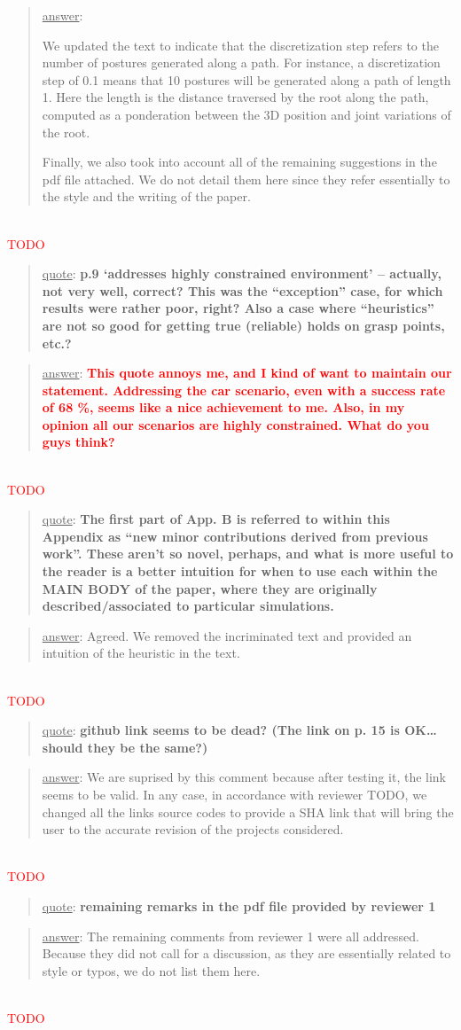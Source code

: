 \documentclass[a4paper]{article}
\newcommand{\ndone}[0]{\textcolor{red}{TODO}}
\newcommand\quot[1]{\begin{quote} \underline{quote}: \textbf{#1}\end{quote}}
\newcommand\as[1]{\begin{quote} \underline{answer}: {#1}\end{quote} \leavevmode \\ }
\begin{document}
\as{We updated the text to indicate that the discretization step refers to the number of postures generated along a path. For instance, a discretization step of 0.1 means
that 10 postures will be generated along a path of length 1. Here the length is the distance traversed by the root along the path, computed as a ponderation between the 3D position and joint variations of the root.

Finally, we also took into account all of the remaining suggestions in the pdf file attached. We do not detail them here since they refer essentially to the style 
and the writing of the paper.}\ndone

\quot{
p.9 ‘addresses highly constrained environment’ – actually, not very well, correct? This was the “exception” case, for which results were rather poor, right? Also a case where “heuristics” are not so good for getting true (reliable) holds on grasp points, etc.?
}

\as{\textbf{\textcolor{red}{This quote annoys me, and I kind of want to maintain our statement. Addressing the car scenario, even with a success rate of 68 \%, seems like a nice achievement to me.
Also, in my opinion all our scenarios are highly constrained. What do you guys think?}}}\ndone

\quot{
The first part of App. B is referred to within this Appendix as “new minor contributions derived from previous work”. These aren’t so novel, perhaps, and what is more useful to the reader is a better intuition for when to use each within the MAIN BODY of the paper, where they are originally described/associated to particular simulations.
}

\as{Agreed. We removed the incriminated text and provided an intuition of the heuristic in the text.}\ndone

\quot{github link seems to be dead? (The link on p. 15 is OK… should they be the same?)}

\as{We are suprised by this comment because after testing it, the link seems to be valid. In any case, in accordance with reviewer TODO, we changed all the links source codes to provide a SHA link that will bring the user to the accurate revision of the projects considered.}\ndone

\quot{remaining remarks in the pdf file provided by reviewer 1}
\as{The remaining comments from reviewer 1 were all addressed. Because they did not call for a discussion, as they are essentially related to style or typos, we do not list them here.}\ndone
\end{document}
